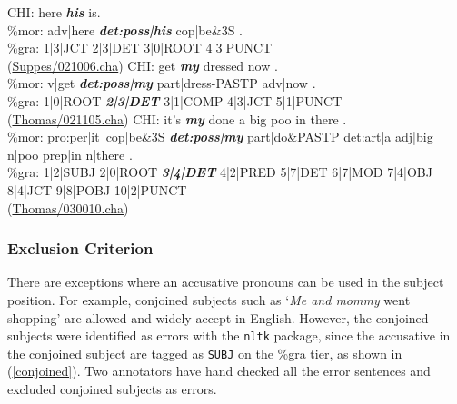 \begin{exe}
\ex \label{his} \gll *CHI:	here \textit{\textbf{his}} is. \\
\%mor:	adv|here \textbf{\textit{det:poss|his}} cop|be&3S .\\
\%gra:	1|3|JCT 2|3|DET 3|0|ROOT 4|3|PUNCT\\
(\href{https://childes.talkbank.org/browser/index.php?url=Eng-NA/Suppes/021006.cha}{Suppes/021006.cha})
\ex \label{getdressed} \gll *CHI: get \textit{\textbf{my}} dressed now .\\
\%mor:	v|get \textit{\textbf{det:poss|my}} part|dress-PASTP adv|now .\\
\%gra:	1|0|ROOT \textit{\textbf{2|3|DET}} 3|1|COMP 4|3|JCT 5|1|PUNCT\\
(\href{https://childes.talkbank.org/browser/index.php?url=Eng-UK/Thomas/021105.cha}{Thomas/021105.cha})
\ex \label{bigpoop} \gll *CHI:	it's \textit{\textbf{my}} done a big poo in there . \\
\%mor:	pro:per|it~cop|be&3S \textit{\textbf{det:poss|my}} part|do&PASTP det:art|a adj|big n|poo prep|in n|there .\\
\%gra:	1|2|SUBJ 2|0|ROOT \textit{\textbf{3|4|DET}} 4|2|PRED 5|7|DET 6|7|MOD 7|4|OBJ 8|4|JCT	9|8|POBJ 10|2|PUNCT\\
(\href{https://childes.talkbank.org/browser/index.php?url=Eng-UK/Thomas/030010.cha}{Thomas/030010.cha})
\end{exe}


\subsubsection{Exclusion Criterion}
There are exceptions where an accusative pronouns can be used in the subject position. For example, conjoined subjects such as `\textit{Me and mommy} went shopping' are allowed and widely accept in English. However, the conjoined subjects were identified as errors with the \texttt{nltk} package, since the accusative in the conjoined subject are tagged as \texttt{SUBJ} on the {\%gra} tier, as shown in (\ref{conjoined}). Two annotators have hand checked all the error sentences and excluded conjoined subjects as errors. 

